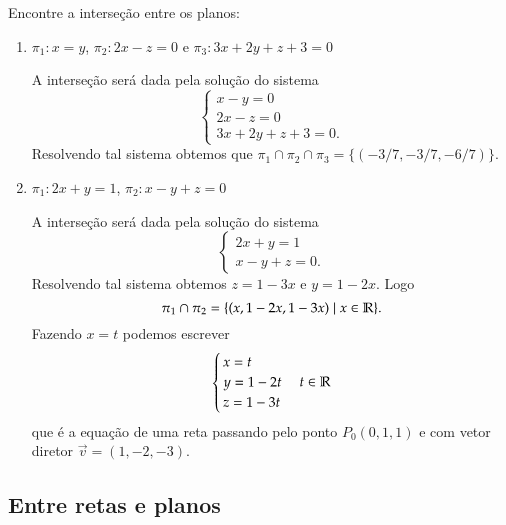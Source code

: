 \begin{exemplos}
    Encontre a interse\c{c}\~ao entre os planos:
    \begin{enumerate}
        \item $\pi_1 : x = y$, $\pi_2 : 2x - z = 0$ e $\pi_3 : 3x + 2y + z + 3 = 0$
        \begin{solucao}
            A interse\c{c}\~ao ser\'a dada pela solu\c{c}\~ao do sistema
            \[
                \begin{cases}
                    x - y = 0\\
                    2x - z = 0\\
                    3x + 2y + z + 3 = 0.
                \end{cases}
            \]
            Resolvendo tal sistema obtemos que $\pi_1\cap\pi_2\cap\pi_3 = \{(-3/7,-3/7,-6/7)\}$.
        \end{solucao}
        \item $\pi_1 : 2x + y = 1$, $\pi_2 : x - y + z = 0$
        \begin{solucao}
            A interse\c{c}\~ao ser\'a dada pela solu\c{c}\~ao do sistema
            \[
                \begin{cases}
                    2x + y = 1\\
                    x - y + z = 0.
                \end{cases}
            \]
            Resolvendo tal sistema obtemos $z = 1 - 3x$ e $y = 1 - 2x$. Logo
            \[
                \pi_1\cap\pi_2 = \{(x,1 - 2x,1 - 3x) \mid x \in \mathbb{R}\}.
            \]
            Fazendo $x = t$ podemos escrever
            \[
                \begin{cases}
                    x = t\\
                    y = 1 - 2t\\
                    z = 1 - 3t
                \end{cases} t \in \mathbb{R}
            \]
            que \'e a equa\c{c}\~ao de uma reta passando pelo ponto $P_0(0,1,1)$ e com vetor diretor $\vec{v} = (1,-2,-3)$.
        \end{solucao}
    \end{enumerate}
\end{exemplos}


\subsection{Entre retas e planos} %
\label{sub:entre_retas_e_planos}

